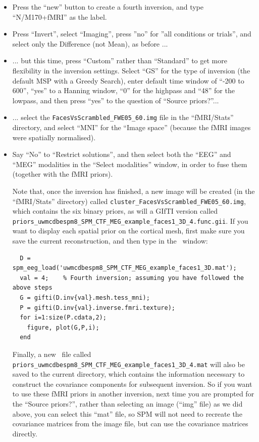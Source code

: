 \begin{itemize}

\item Press the ``new'' button to create a fourth inversion, and type ``N/M170+fMRI'' as the label.

\item Press ``Invert'', select ``Imaging'', press ''no'' for ''all conditions or trials'', and select only the Difference (not Mean), as before ...

\item ... but this time, press ``Custom'' rather than ``Standard'' to get more flexibility in the inversion settings. Select ``GS'' for the type of inversion (the default MSP with a Greedy Search), enter default time window of ``-200 to 600'', ``yes'' to a Hanning window, ``0'' for the highpass and ``48'' for the lowpass, and then press ``yes'' to the question of ``Source priors?''...

\item ... select the \texttt{FacesVsScrambled\_\-FWE05\_\-60.img} file in the ``fMRI/Stats'' directory, and select ``MNI'' for the ``Image space'' (because the fMRI images were spatially normalised).

\item Say ``No'' to ``Restrict solutions'', and then select both the ``EEG'' and ``MEG'' modalities in the ``Select modalities'' window, in order to fuse them (together with the fMRI priors).

Note that, once the inversion has finished, a new image will be created (in the ``fMRI/Stats'' directory) called \texttt{cluster\_\-FacesVsScrambled\_\-FWE05\_\-60.img}, which contains the six binary priors, as will a GIfTI version called \texttt{priors\_\-uwmcdbespm8\_\-SPM\_\-CTF\_\-MEG\_\-example\_\-faces1\_\-3D\_\-4.func.gii}. If you want to display each spatial prior on the cortical mesh, first make sure you save the current reconstruction, and then type in the \matlab\ window: 

\begin{verbatim}
  D = spm_eeg_load('uwmcdbespm8_SPM_CTF_MEG_example_faces1_3D.mat');
  val = 4;    % Fourth inversion; assuming you have followed the above steps
  G = gifti(D.inv{val}.mesh.tess_mni);
  P = gifti(D.inv{val}.inverse.fmri.texture);
  for i=1:size(P.cdata,2);
    figure, plot(G,P,i);
  end
\end{verbatim}

Finally, a new \matlab\ file called \texttt{priors\_\-uwmcdbespm8\_\-SPM\_\-CTF\_\-MEG\_\-example\_\-faces1\_\-3D\_\-4.mat} will also be saved to the current directory, which contains the information necessary to construct the covariance components for subsequent inversion. So if you want to use these fMRI priors in another inversion, next time you are prompted for the ``Source priors?'', rather than selecting an image (``img'' file) as we did above, you can select this ``mat'' file, so SPM will not need to recreate the covariance matrices from the image file, but can use the covariance matrices directly.


\end{itemize}
